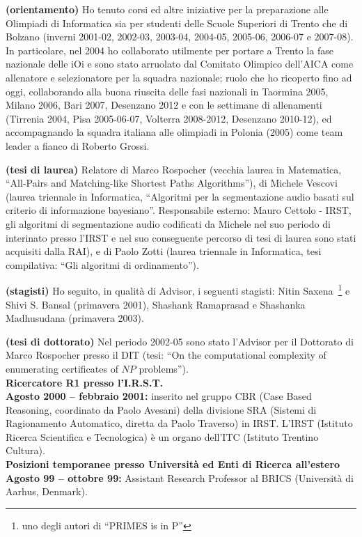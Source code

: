 \documentclass[10pt]{article}
\newcommand{\subvoice}[1] { {\large \bf #1} \smallskip\\ }
\begin{document}
{\bf (orientamento)} Ho tenuto corsi ed altre iniziative
per la preparazione alle Olimpiadi di Informatica
sia per studenti delle Scuole Superiori di Trento
che di Bolzano
(inverni 2001-02, 2002-03, 2003-04, 2004-05, 2005-06, 2006-07 e 2007-08).
In particolare, nel 2004 ho collaborato utilmente
per portare a Trento la fase nazionale delle iOi
e sono stato arruolato dal
Comitato Olimpico dell'AICA come allenatore e selezionatore
per la squadra nazionale;
ruolo che ho ricoperto fino ad oggi,
collaborando alla buona riuscita delle fasi nazionali
in Taormina 2005, Milano 2006, Bari 2007, Desenzano 2012
e con le settimane di allenamenti (Tirrenia 2004,
Pisa 2005-06-07, Volterra 2008-2012, Desenzano 2010-12),
ed accompagnando la squadra italiana alle olimpiadi
in Polonia (2005) come team leader a fianco di Roberto Grossi.

{\bf (tesi di laurea)} Relatore di Marco Rospocher
(vecchia laurea in Matematica,%
 ``All-Pairs and Matching-like Shortest Paths Algorithms''),
di Michele Vescovi
(laurea triennale in Informatica,%
 ``Algoritmi per la segmentazione audio basati
   sul criterio di informazione bayesiano''.
 Responsabile esterno: Mauro Cettolo - IRST,
gli algoritmi di segmentazione audio codificati da Michele
nel suo periodo di interinato presso l'IRST
e nel suo conseguente percorso di tesi di laurea sono stati
acquisiti dalla RAI),
e di Paolo Zotti
(laurea triennale in Informatica,
 tesi compilativa: ``Gli algoritmi di ordinamento'').

{\bf (stagisti)} Ho seguito, in qualit\`a di Advisor,
i seguenti stagisti: Nitin Saxena~\footnote{uno degli autori di ``PRIMES is in P''} e Shivi S. Bansal (primavera 2001),
Shashank Ramaprasad e Shashanka Madhusudana (primavera 2003).

{\bf (tesi di dottorato)} Nel periodo 2002-05 sono stato l'Advisor per il Dottorato di Marco
Rospocher presso il DIT (tesi: ``On the computational complexity
of enumerating certificates of $NP$ problems'').\\


\subvoice{Ricercatore R1 presso l'I.R.S.T.}
{\bf Agosto 2000 -- febbraio 2001:}
inserito nel gruppo CBR (Case Based Reasoning, coordinato da Paolo Avesani)
della divisione SRA
(Sistemi di Ragionamento Automatico, diretta da Paolo Traverso) in IRST.
L'IRST (Istituto Ricerca Scientifica e Tecnologica)
\`e un organo dell'ITC (Istituto Trentino Cultura).\\

\subvoice{Posizioni temporanee presso Universit\`a ed Enti di Ricerca all'estero}
{\bf Agosto 99 -- ottobre 99:}
     Assistant Research Professor
     al  BRICS (Universit\`a di Aarhus, Denmark). 
\end{document}
